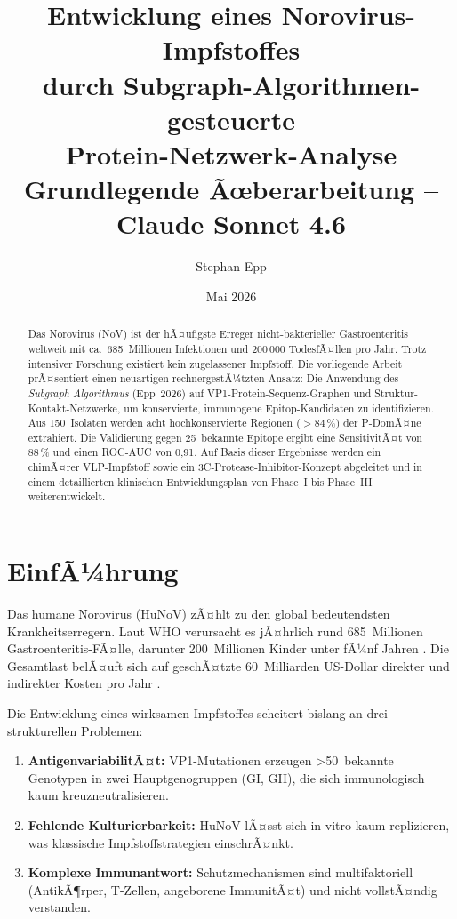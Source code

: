 ﻿\documentclass[a4paper,12pt]{article}
\title{\textbf{Entwicklung eines Norovirus-Impfstoffes\\[4pt]
durch Subgraph-Algorithmen-gesteuerte\\[4pt]
Protein-Netzwerk-Analyse}\\[10pt]
{\large Grundlegende Ãœberarbeitung -- Claude Sonnet 4.6}}
\author{Stephan Epp}
\date{Mai 2026}
\theoremstyle{plain}
\theoremstyle{definition}
\theoremstyle{remark}
\begin{document}
\maketitle
\begin{abstract}
\noindent
Das Norovirus (NoV) ist der hÃ¤ufigste Erreger nicht-bakterieller Gastroenteritis weltweit mit
ca.~685~Millionen Infektionen und 200\,000 TodesfÃ¤llen pro Jahr. Trotz intensiver Forschung
existiert kein zugelassener Impfstoff. Die vorliegende Arbeit prÃ¤sentiert einen neuartigen
rechnergestÃ¼tzten Ansatz: Die Anwendung des \emph{Subgraph Algorithmus} (Epp~2026) auf
VP1-Protein-Sequenz-Graphen und Struktur-Kontakt-Netzwerke, um konservierte, immunogene
Epitop-Kandidaten zu identifizieren. Aus 150~Isolaten werden acht hochkonservierte Regionen
($>84\,\%$) der P-DomÃ¤ne extrahiert. Die Validierung gegen 25~bekannte Epitope ergibt eine
SensitivitÃ¤t von 88\,\% und einen ROC-AUC von 0{,}91. Auf Basis dieser Ergebnisse werden ein
chimÃ¤rer VLP-Impfstoff sowie ein 3C-Protease-Inhibitor-Konzept abgeleitet und in einem
detaillierten klinischen Entwicklungsplan von Phase~I bis Phase~III weiterentwickelt.
\end{abstract}

\tableofcontents
\newpage

\section{EinfÃ¼hrung}

Das humane Norovirus (HuNoV) zÃ¤hlt zu den global bedeutendsten Krankheitserregern.
Laut WHO verursacht es jÃ¤hrlich rund 685~Millionen Gastroenteritis-FÃ¤lle, darunter
200~Millionen Kinder unter fÃ¼nf Jahren \citep{who2021norovirus}. Die Gesamtlast belÃ¤uft
sich auf geschÃ¤tzte 60~Milliarden US-Dollar direkter und indirekter Kosten pro Jahr
\citep{bartsch2016norovirus}.

Die Entwicklung eines wirksamen Impfstoffes scheitert bislang an drei strukturellen Problemen:
\begin{enumerate}[label=\arabic*.]
  \item \textbf{AntigenvariabilitÃ¤t:} VP1-Mutationen erzeugen >50~bekannte Genotypen in zwei
        Hauptgenogruppen (GI, GII), die sich immunologisch kaum kreuzneutralisieren.
  \item \textbf{Fehlende Kulturierbarkeit:} HuNoV lÃ¤sst sich in vitro kaum replizieren,
        was klassische Impfstoffstrategien einschrÃ¤nkt.
  \item \textbf{Komplexe Immunantwort:} Schutzmechanismen sind multifaktoriell
        (AntikÃ¶rper, T-Zellen, angeborene ImmunitÃ¤t) und nicht vollstÃ¤ndig verstanden.
\end{enumerate}
\end{document}
